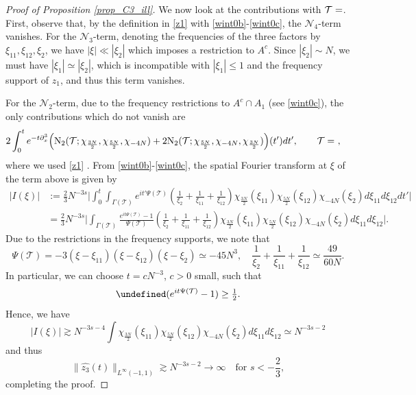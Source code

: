 \documentclass[a4paper,
11pt,  reqno]{amsart}
\makeatletter
\newcommand{\5}{\textup{V}}
\newcommand{\ft}{\widehat}
\newcommand{\dx}{\partial_x}
\theoremstyle{remark}
\let\Re=\undefined\DeclareMathOperator*{\Re}{Re}
\newcommand{\TT}{\mathcal{T}}
\newcommand{\G}{\Gamma}
\def\<#1>{\csname MH@symb@#1\endcsname}
\numberwithin{equation}{section}
\numberwithin{theorem}{section}
\newcommand{\NN}{\mathrm{N}}
\newcommand{\Ncal}{\mathcal{N}}
\makeatother
\begin{document}
\begin{proof}[Proof of Proposition \ref{prop_C3_ill}]
    We now look at the contributions with $\TT=\<21>$. First, observe that, by the definition in \eqref{z1} with \eqref{wint0b}-\eqref{wint0c}, the $\Ncal_4$-term vanishes.
    {
    For the $\Ncal_3$-term, denoting the frequencies of the three factors by $\xi_{11}, \xi_{12}, \xi_2$,
    we have $|\xi|\ll |\xi_2|$ which imposes a restriction to $A^c$. Since $|\xi_2|\sim N$, we must have $|\xi_1| \simeq |\xi_2|$, which is incompatible with $|\xi_1| \le 1$ and the frequency support of $z_1$, and thus this term vanishes.
    }

    For the $\Ncal_2$-term, due to the frequency restrictions to $A^c \cap A_1$ (see \eqref{wint0c}), the only contributions which do not vanish are
{
\begin{align}
&
2 \int_0^t e^{-t\dx^3} \Big(
\NN_2(\TT;  \chi_{\frac{3N}2}, \chi_{\frac{5N}2}, \chi_{-4N})
+ 2 \NN_2(\TT; \chi_{\frac{5N}2}, \chi_{-4N}, \chi_{\frac{3N}2})
\Big)(t') dt',\qquad \TT=\<21>\ ,
\end{align}
where we used
\eqref{z1} .
}
    From \eqref{wint0b}-\eqref{wint0c}, the spatial Fourier transform at $\xi$ of the term above is given by
    {
    \begin{align}
        | I(\xi) |
        & := \tfrac23 N^{-3s}
        \bigg|
        \int_0^t
        \int_{\G(\TT)} e^{it'\Psi(\TT)}\left(\frac{1}{\xi_2} + \frac{1}{\xi_{11}}  + \frac{1}{\xi_{12}} \right)\chi_{\frac{3N}2}(\xi_{11})\chi_{\frac{5N}2}(\xi_{12})\chi_{-4N}(\xi_{2})d\xi_{11}d\xi_{12}
        dt'
        \bigg|
        \\
        & =
        \tfrac{2}{3}
        N^{-3s}
        \bigg|
        \int_{\G(\TT)} \frac{e^{it\Psi(\TT)}-1}{\Psi(\TT)}\left(\frac{1}{\xi_2} + \frac{1}{\xi_{11}}  + \frac{1}{\xi_{12}} \right)\chi_{\frac{3N}2}(\xi_{11})\chi_{\frac{5N}2}(\xi_{12})\chi_{-4N}(\xi_{2})d\xi_{11}d\xi_{12}
        \bigg|
        .
    \end{align}
    }
    Due to the restrictions in the frequency supports, we note that
    $$
     \Psi(\TT)=-3(\xi-\xi_{11})(\xi-\xi_{12})(\xi-\xi_{2}) \simeq -45N^3,\quad \frac{1}{\xi_2} + \frac{1}{\xi_{11}}  + \frac{1}{\xi_{12}} \simeq \frac{49}{60N}.
    $$
    In particular, we can choose $t=cN^{-3}$, $c>0$ small, such that
    $$
    \Re (e^{it\Psi(\TT)}-1) \ge \tfrac12.
    $$
    Hence, we have
    $$
    |I(\xi)|\gtrsim N^{-3s-4}\int \chi_{\frac{3N}2}(\xi_{11})\chi_{\frac{5N}2}(\xi_{12})\chi_{-4N}(\xi_{2})d\xi_{11}d\xi_{12}  \simeq N^{-3s-2}
    $$
    and thus
    $$
    \|\ft{z_3}(t)\|_{L^{\infty}(-1,1)}\gtrsim N^{-3s-2}\to \infty\quad \mbox{for }s<-\frac{2}{3},
    $$
    completing the proof. \qedhere

\end{proof}
\end{document}
